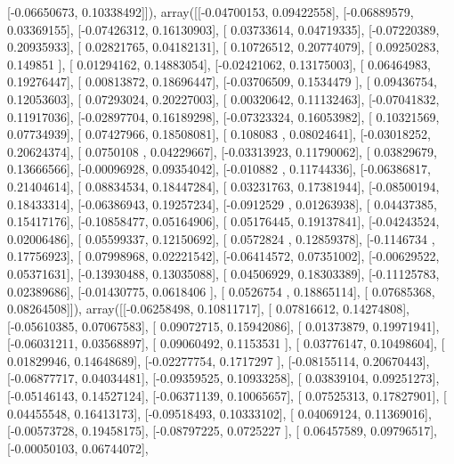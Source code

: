 \documentclass{article}
\begin{document}
       [-0.06650673,  0.10338492]]), array([[-0.04700153,  0.09422558],
       [-0.06889579,  0.03369155],
       [-0.07426312,  0.16130903],
       [ 0.03733614,  0.04719335],
       [-0.07220389,  0.20935933],
       [ 0.02821765,  0.04182131],
       [ 0.10726512,  0.20774079],
       [ 0.09250283,  0.149851  ],
       [ 0.01294162,  0.14883054],
       [-0.02421062,  0.13175003],
       [ 0.06464983,  0.19276447],
       [ 0.00813872,  0.18696447],
       [-0.03706509,  0.1534479 ],
       [ 0.09436754,  0.12053603],
       [ 0.07293024,  0.20227003],
       [ 0.00320642,  0.11132463],
       [-0.07041832,  0.11917036],
       [-0.02897704,  0.16189298],
       [-0.07323324,  0.16053982],
       [ 0.10321569,  0.07734939],
       [ 0.07427966,  0.18508081],
       [ 0.108083  ,  0.08024641],
       [-0.03018252,  0.20624374],
       [ 0.0750108 ,  0.04229667],
       [-0.03313923,  0.11790062],
       [ 0.03829679,  0.13666566],
       [-0.00096928,  0.09354042],
       [-0.010882  ,  0.11744336],
       [-0.06386817,  0.21404614],
       [ 0.08834534,  0.18447284],
       [ 0.03231763,  0.17381944],
       [-0.08500194,  0.18433314],
       [-0.06386943,  0.19257234],
       [-0.0912529 ,  0.01263938],
       [ 0.04437385,  0.15417176],
       [-0.10858477,  0.05164906],
       [ 0.05176445,  0.19137841],
       [-0.04243524,  0.02006486],
       [ 0.05599337,  0.12150692],
       [ 0.0572824 ,  0.12859378],
       [-0.1146734 ,  0.17756923],
       [ 0.07998968,  0.02221542],
       [-0.06414572,  0.07351002],
       [-0.00629522,  0.05371631],
       [-0.13930488,  0.13035088],
       [ 0.04506929,  0.18303389],
       [-0.11125783,  0.02389686],
       [-0.01430775,  0.0618406 ],
       [ 0.0526754 ,  0.18865114],
       [ 0.07685368,  0.08264508]]), array([[-0.06258498,  0.10811717],
       [ 0.07816612,  0.14274808],
       [-0.05610385,  0.07067583],
       [ 0.09072715,  0.15942086],
       [ 0.01373879,  0.19971941],
       [-0.06031211,  0.03568897],
       [ 0.09060492,  0.1153531 ],
       [ 0.03776147,  0.10498604],
       [ 0.01829946,  0.14648689],
       [-0.02277754,  0.1717297 ],
       [-0.08155114,  0.20670443],
       [-0.06877717,  0.04034481],
       [-0.09359525,  0.10933258],
       [ 0.03839104,  0.09251273],
       [-0.05146143,  0.14527124],
       [-0.06371139,  0.10065657],
       [ 0.07525313,  0.17827901],
       [ 0.04455548,  0.16413173],
       [-0.09518493,  0.10333102],
       [ 0.04069124,  0.11369016],
       [-0.00573728,  0.19458175],
       [-0.08797225,  0.0725227 ],
       [ 0.06457589,  0.09796517],
       [-0.00050103,  0.06744072],
\end{document}
